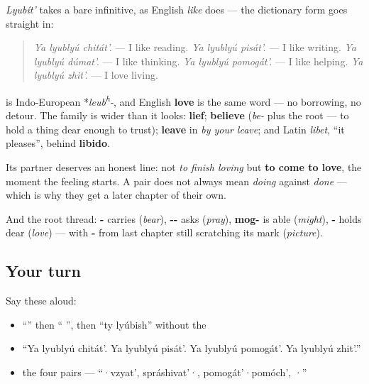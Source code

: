 \begin{grammarlens}[title={Grammar Lens: now say everything at once}]
\emph{Lyubít'} takes a bare infinitive, as English \emph{like} does — the dictionary form goes straight in:

\begin{quote}
\emph{Ya lyublyú chitát'.} — I like reading. \emph{Ya lyublyú pisát'.} — I like writing. \emph{Ya lyublyú dúmat'.} — I like thinking. \emph{Ya lyublyú pomogát'.} — I like helping. \emph{Ya lyublyú zhit'.} — I love living.
\end{quote}
\end{grammarlens}

\begin{cousinweb}
\textbf{} is Indo-European *\emph{leub\textsuperscript{h}-}, and English \textbf{love} is the same word — no borrowing, no detour. The family is wider than it looks: \textbf{lief}; \textbf{believe} (\emph{be-} plus the root — to hold a thing dear enough to trust); \textbf{leave} in \emph{by your leave}; and Latin \emph{libet}, \textquotedblleft{}it pleases\textquotedblright{}, behind \textbf{libido}.

Its partner \textbf{} deserves an honest line: not \emph{to finish loving} but \textbf{to come to love}, the moment the feeling starts. A pair does not always mean \emph{doing} against \emph{done} — which is why they get a later chapter of their own.

And the root thread: \textbf{-} carries (\emph{bear}), \textbf{--} asks (\emph{pray}), \textbf{mog-} is able (\emph{might}), \textbf{-} holds dear (\emph{love}) — with \textbf{-} from last chapter still scratching its mark (\emph{picture}).
\end{cousinweb}

\subsection*{Your turn}
Say these aloud:

\begin{itemize}
\raggedright
  \item \textquotedblleft{}\textquotedblright{} then \textquotedblleft{} \textquotedblright{}, then \textquotedblleft{}ty lyúbish\textquotedblright{} without the \emph{}
  \item \textquotedblleft{}Ya lyublyú chitát'. Ya lyublyú pisát'. Ya lyublyú pomogát'. Ya lyublyú zhit'.\textquotedblright{}
  \item the four pairs — \textquotedblleft{}·vzyat', spráshivat'·, pomogát'·pomóch', ·\textquotedblright{}
\end{itemize}

